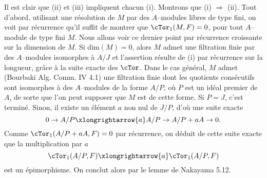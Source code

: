 Il est clair que (ii) et (iii) impliquent chacun (i). Montrons que (i) $\Rightarrow$ (ii). Tout d'abord, utilisant une résolution de $M$ par des $A$--modules libres de type fini, on voit par récurrence qu'il suffit de montrer que $\cTor_1(M, F) =  0$, pour tout $A$--module de type fini $M$. Nous allons voir ce dernier point par récurrence croissante sur la dimension de $M$. Si dim$(M) = 0$, alors $M$ admet une filtration finie par des $A$--modules isomorphes à $A/J$ et l'assertion résulte de (i) par récurrence sur la longueur, grâce à la suite exacte des $\cTor$. Dans le cas général, $M$ admet (Bourbaki Alg. Comm. IV 4.1) une filtration finie dont les quotients consécutifs sont isomorphes à des $A$--modules de la forme $A/P$, où $P$ est un idéal premier de $A$, de sorte que l'on peut supposer que $M$ est de cette forme. Si $P = J$, c'est terminé. Sinon, il existe un élément $a$ non nul de $J/P$, d'où une suite exacte
$$
0 \to A/P \xlongrightarrow{a} A/P \to A/P+aA \to 0.
$$
Comme $\cTor_1(A/P+aA, F) = 0$ par récurrence, on déduit de cette suite exacte que la multiplication par $a$
$$
\cTor_1(A/P, F) \xlongrightarrow{a} \cTor_1(A/P, F)
$$
est un épimorphisme. On conclut alors par le lemme de Nakayama 5.12.

